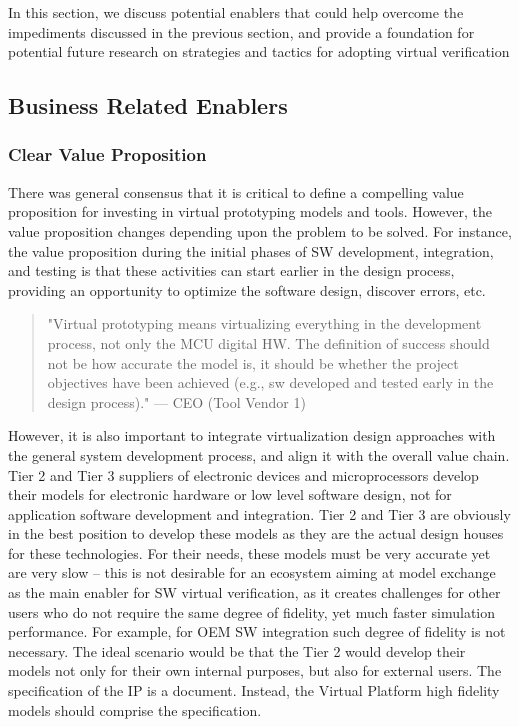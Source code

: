 In this section, we discuss potential enablers that could help overcome the impediments discussed in the previous section, and provide a foundation for potential future research on strategies and tactics for adopting virtual verification

\subsection{Business Related Enablers}
\subsubsection{Clear Value Proposition}
There was general consensus that it is critical to define a compelling value proposition for investing in virtual prototyping models and tools. However, the value proposition changes depending upon the problem to be solved. For instance, the value proposition during the initial phases of SW development, integration, and testing is that these activities can start earlier in the design process, providing an opportunity to optimize the software design, discover errors, etc.

\begin{quote}
"Virtual prototyping means virtualizing everything in the development process, not only the MCU digital HW. The definition of success should not be how accurate the model is, it should be whether the project objectives have been achieved (e.g., sw developed and tested early in the design process)."
— CEO (Tool Vendor 1)
\end{quote}

However, it is also important to integrate virtualization design approaches with the general system development process, and align it with the overall value chain.
Tier 2 and Tier 3 suppliers of electronic devices and microprocessors develop their models for electronic hardware or low level software design, not for application software development and integration. Tier 2 and Tier 3 are obviously in the best position to develop these models as they are the actual design houses for these technologies. For their needs, these models must be very accurate yet are very slow -- this is not desirable for an ecosystem aiming at model exchange as the main enabler for SW virtual verification, as it creates challenges for other users who do not require the same degree of fidelity, yet much faster simulation performance. For example, for OEM SW integration such degree of fidelity is not necessary.  The ideal scenario would be that the Tier 2 would develop their models not only for their own internal purposes, but also  for external users. The specification of the IP is a document. Instead, the Virtual Platform high fidelity models should comprise the specification. 


